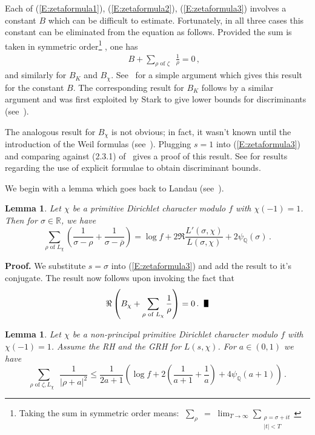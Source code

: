 \documentclass{amsart}
\newtheorem{lemma}[theorem]{Lemma}
\numberwithin{equation}{section}
\numberwithin{table}{section}
\begin{document}
Each of (\ref{E:zetaformula1}), (\ref{E:zetaformula2}), (\ref{E:zetaformula3}) involves a constant $B$ which can be difficult to estimate.
Fortunately, in all three cases this constant can be eliminated from the equation
as follows.
Provided the sum is taken in symmetric order\footnote
{
Taking the sum in symmetric order means:  $\;\displaystyle\sum_\rho \;=\; \lim_{T\to\infty}\sum_{\substack{\rho=\sigma+it\\|t|<T}}$
}
,
one has
\begin{eqnarray}
  &&
  B+\sum_{\rho\text{ of $\zeta$ }}\frac{1}{\rho}=0
  \,,
\end{eqnarray}
and similarly for $B_K$ and $B_\chi$.
See~\cite{davenport:mnt} for a simple argument which gives this result for the constant $B$.
The corresponding result for $B_K$ follows by a similar argument and
was first exploited by Stark to give lower bounds for discriminants (see~\cite{stark:1974, stark:1975}).

The analogous result for $B_\chi$
is not obvious; in fact, it wasn't known until the
introduction of the Weil formulas (see~\cite{weil:ef.1, weil:ef.2}).
Plugging $s=1$ into (\ref{E:zetaformula3}) and comparing against (2.3.1) of~\cite{murty:2009} 
gives a proof of this result.
See \cite{poitou:1, poitou:2, odlyzko:1990} for results regarding the use of explicit formulae
to obtain discriminant bounds.

We begin with a lemma which goes back to Landau (see~\cite{landau:1}).
\begin{lemma}\label{L:stark}
Let $\chi$ be a primitive Dirichlet character modulo $f$ with $\chi(-1)=1$.
Then for $\sigma\in{\mathbb{R}}$, we have
$$
\sum_{\rho\text{ of } L_\chi}
\left(
\frac{1}{\sigma-\rho}
+
\frac{1}{\sigma-\overline{\rho}}
\right)
=
\log f
+
2
\Re
\frac{L'(\sigma,\chi)}{L(\sigma,\chi)}
+
2\psi_{\mathbb{Q}}(\sigma)
\,.
$$
\end{lemma}

\noindent\textbf{Proof.}
We substitute $s=\sigma$ into
(\ref{E:zetaformula3})
and add the result to it's conjugate.
The result now follows upon invoking the fact that
$$
  \Re\left(
  B_\chi
  +
  \sum_{\rho\text{ of } L_\chi}
  \frac{1}{\rho}
  \right)
  =0
  \,.
  \;\;
  \text{\raisebox{-.25ex}{\scalebox{.786}[1.272]{$\blacksquare$}}}
$$ 

\begin{lemma}\label{L:justlike}
Let $\chi$ be a non-principal primitive Dirichlet character modulo $f$ with $\chi(-1)=1$.
Assume the RH and the GRH for $L(s,\chi)$.
For $a\in(0,1)$ we have
$$
  
    \sum_{\rho\text{ of $\zeta,L_\chi$ }}
  \frac{1}{|\rho+a|^2}
  \leq
  \frac{1}{2a+1}
  \left(
  \log f
  +
  2
  \left(\frac{1}{a+1}+\frac{1}{a}\right)
  +
  4\psi_{\mathbb{Q}}(a+1)
  \right)
  \,.
$$
\end{lemma}
\end{document}

